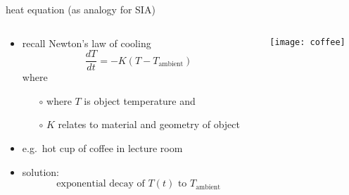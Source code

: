\begin{frame}{heat equation (as analogy for SIA)}

\begin{columns}
\begin{column}{0.75\textwidth}
\begin{itemize}
\item recall Newton's law of cooling
	$$\frac{dT}{dt} = -K (T-T_{\text{ambient}})$$
where
  \begin{itemize}
  \item[$\circ$] where $T$ is object temperature and
  \item[$\circ$] $K$ relates to material and geometry of object
  \end{itemize}

\bigskip
\item e.g.~hot cup of coffee in lecture room

\bigskip
\item solution:
  $$\text{exponential decay of $T(t)$ to $T_{\text{ambient}}$}$$
\end{itemize}
\end{column}

\begin{column}{0.25\textwidth}
\vspace{1.0in}

\texttt{[image: coffee]}
\end{column}
\end{columns}
\end{frame}


